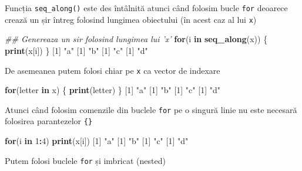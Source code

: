 \documentclass[]{article}
\newenvironment{Shaded}{\begin{snugshade}}{\end{snugshade}}
\newcommand{\CommentTok}[1]{\textcolor[rgb]{0.56,0.35,0.01}{\textit{#1}}}
\newcommand{\ControlFlowTok}[1]{\textcolor[rgb]{0.13,0.29,0.53}{\textbf{#1}}}
\newcommand{\DecValTok}[1]{\textcolor[rgb]{0.00,0.00,0.81}{#1}}
\newcommand{\KeywordTok}[1]{\textcolor[rgb]{0.13,0.29,0.53}{\textbf{#1}}}
\newcommand{\NormalTok}[1]{#1}
\newcommand{\OperatorTok}[1]{\textcolor[rgb]{0.81,0.36,0.00}{\textbf{#1}}}
\newcommand{\StringTok}[1]{\textcolor[rgb]{0.31,0.60,0.02}{#1}}
\begin{document}
Funcția \texttt{seq\_along()} este des întâlnită atunci când folosim
bucle \texttt{for} deoarece crează un șir întreg folosind lungimea
obiectului (în acest caz al lui \texttt{x})

\begin{Shaded}
\begin{Highlighting}[]
\CommentTok{## Genereaza un sir folosind lungimea lui 'x'}
\ControlFlowTok{for}\NormalTok{(i }\ControlFlowTok{in} \KeywordTok{seq_along}\NormalTok{(x)) \{   }
        \KeywordTok{print}\NormalTok{(x[i])}
\NormalTok{\}}
\NormalTok{[}\DecValTok{1}\NormalTok{] }\StringTok{"a"}
\NormalTok{[}\DecValTok{1}\NormalTok{] }\StringTok{"b"}
\NormalTok{[}\DecValTok{1}\NormalTok{] }\StringTok{"c"}
\NormalTok{[}\DecValTok{1}\NormalTok{] }\StringTok{"d"}
\end{Highlighting}
\end{Shaded}

De asemeanea putem folosi chiar pe \texttt{x} ca vector de indexare

\begin{Shaded}
\begin{Highlighting}[]
\ControlFlowTok{for}\NormalTok{(letter }\ControlFlowTok{in}\NormalTok{ x) \{}
        \KeywordTok{print}\NormalTok{(letter)}
\NormalTok{\}}
\NormalTok{[}\DecValTok{1}\NormalTok{] }\StringTok{"a"}
\NormalTok{[}\DecValTok{1}\NormalTok{] }\StringTok{"b"}
\NormalTok{[}\DecValTok{1}\NormalTok{] }\StringTok{"c"}
\NormalTok{[}\DecValTok{1}\NormalTok{] }\StringTok{"d"}
\end{Highlighting}
\end{Shaded}

Atunci când folosim comenzile din buclele \texttt{for} pe o singură
linie nu este necesară folosirea parantezelor \texttt{\{\}}

\begin{Shaded}
\begin{Highlighting}[]
\ControlFlowTok{for}\NormalTok{(i }\ControlFlowTok{in} \DecValTok{1}\OperatorTok{:}\DecValTok{4}\NormalTok{) }\KeywordTok{print}\NormalTok{(x[i])}
\NormalTok{[}\DecValTok{1}\NormalTok{] }\StringTok{"a"}
\NormalTok{[}\DecValTok{1}\NormalTok{] }\StringTok{"b"}
\NormalTok{[}\DecValTok{1}\NormalTok{] }\StringTok{"c"}
\NormalTok{[}\DecValTok{1}\NormalTok{] }\StringTok{"d"}
\end{Highlighting}
\end{Shaded}

Putem folosi buclele \texttt{for} și imbricat (nested)
\end{document}
